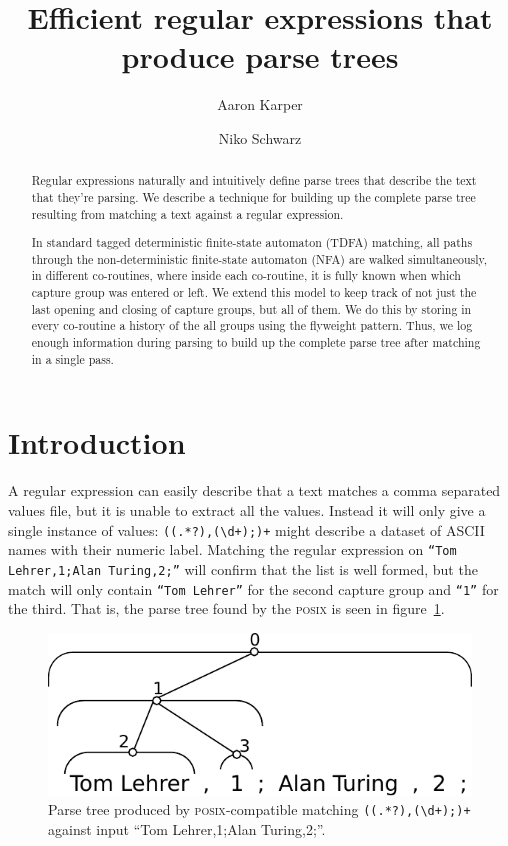 \documentclass[english,twocolumn]{article}
\author{Aaron Karper \and Niko Schwarz}
\theoremstyle{definition}
\newcommand{\Figref}[1]{figure~\ref{fig:#1}}
\newcommand{\figlabel}[1]{\label{fig:#1}}
\begin{document}
\setlength{\pdfpageheight}{\paperheight}
\setlength{\pdfpagewidth}{\paperwidth}

\frenchspacing

\title{Efficient regular expressions that produce parse trees}

\maketitle

\begin{abstract}
Regular expressions naturally and intuitively define parse trees that describe
the text that they're parsing.
We describe a technique for building
up the complete parse tree resulting from matching a text against
a regular expression.

In standard tagged deterministic finite-state automaton (TDFA) matching, 
all paths through the non-deterministic finite-state automaton (NFA) are walked
simultaneously, in different co-routines, where inside each co-routine,
it is fully known when which capture group was entered or left. We
extend this model to keep track of not just the last opening and
closing of capture groups, but all of them. We do this by storing
in every co-routine a history of the all groups using the flyweight
pattern.  Thus, we log enough information during parsing to build
up the complete parse tree after matching in a single pass.

\end{abstract}


\section{Introduction}

A regular expression can easily describe that a text matches a comma
separated values file, but it is unable to extract all the values.
Instead it will only give a single instance of values: \texttt{((.*?),(\textbackslash d+);)+} might describe a dataset of ASCII names
with their numeric label. Matching the regular expression on \texttt{``Tom
Lehrer,1;Alan Turing,2;''} will confirm that the list is well formed,
but the match will only contain \texttt{``Tom Lehrer''} for the
second capture group and \texttt{``1''} for the third. That is,
the parse tree found by the \textsc{posix} is seen in \Figref{posix}.

\begin{figure}[htp]
\centering
\includegraphics[width=.75\linewidth]{graphs/posix_parse}
\caption{\figlabel{lehrer-posix} Parse tree produced by \textsc{posix}-compatible matching \texttt{((.*?),(\textbackslash d+);)+} against input ``Tom
Lehrer,1;Alan Turing,2;''.}
\figlabel{posix}
\end{figure}
\end{document}
